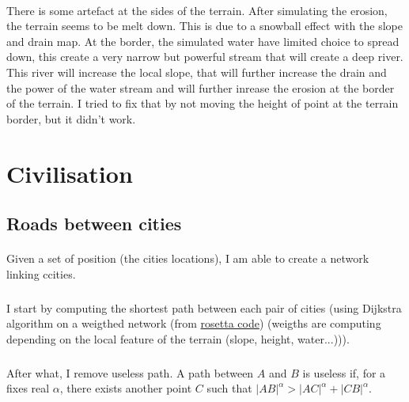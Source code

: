 \documentclass[a4paper,12pt]{article}
\begin{document}
\paragraph{} There is some artefact at the sides of the terrain. After simulating the  erosion, the terrain seems to be melt down. This is due to a snowball effect with the slope and drain map. At the border, the simulated water have limited choice to spread down, this create a very narrow but powerful stream that will create a deep river. This river will increase the local slope, that will further increase the drain and the power of the water stream and will further inrease the erosion at the border of the terrain. I tried to fix that by not moving the height of point at the terrain border, but it didn't work.

\section*{Civilisation}


\subsection*{Roads between cities}


\paragraph{} Given a set of position (the cities locations), I am able to create a network linking ccities.
\subparagraph{} I start by computing the shortest path between each pair of cities (using Dijkstra algorithm on a weigthed network (from \href{https://rosettacode.org/wiki/Dijkstra\%27s_algorithm}{rosetta code}) (weigths are computing depending on the local feature of the terrain (slope, height, water...))).
\subparagraph{} After what, I remove useless path. A path between $A$ and $B$ is useless if, for a fixes real $\alpha$, there exists another point $C$ such that $\left| AB \right|^\alpha > \left| AC \right|^\alpha + \left| CB \right|^\alpha$.
\end{document}
